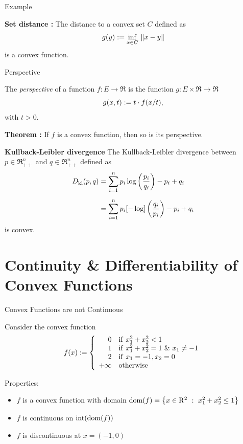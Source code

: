 \documentclass[9pt]{beamer}
\begin{document}
\begin{frame}{Example}

  \textbf{Set distance :} The distance to a convex set $C$ defined as
  \[
    g(y) := \inf_{x\in C} \, \left\|x-y\right\|
  \]
  is a convex function.

\end{frame}

\begin{frame}{Perspective}

  The \emph{perspective} of a function $f : E \to \Re$ is the function $g:E\times\Re \to\Re$
  \[
    g(x, t) := t \cdot f(x/t),
  \]
  with $t>0$.

  \vfill

  \textbf{Theorem : } If $f$ is a convex function, then so is its perspective.

  \vfill

  \textbf{Kullback-Leibler divergence} The Kullback-Leibler divergence between $p\in\Re^n_{++}$ and $q\in\Re^n_{++}$ defined as
  \begin{align*}
    D_{\rm{kl}}(p, q)   & = \sum_{i=1}^n p_i \log\left(\frac{p_i}{q_i}\right) - p_i + q_i \\[0.5em]
                      & = \sum_{i=1}^n p_i [-\log]\left(\frac{q_i}{p_i}\right) - p_i + q_i
  \end{align*}
  is convex.
  
\end{frame}


\section{Continuity \& Differentiability of Convex Functions}

\begin{frame}{Convex Functions are not Continuous}

  Consider the convex function
  \[
    f(x) :=\left\{
      \begin{array}{rl}
        0 & {\rm{if~}} x_1^2+x_2^2 < 1 \\
        1 & {\rm{if~}} x_1^2+x_2^2 = 1 ~\&~ x_1\neq -1 \\
        2 & {\rm{if~}} x_1=-1, x_2=0 \\
        +\infty & {\rm{otherwise}}
      \end{array}\right.
  \]

  \vfill
  
  Properties:
  \begin{itemize}
  \item $f$ is a convex function with domain $\operatorname{dom}(f) = \left\{ x\in\mathrm{R}^2\ : \ x^2_1+x^2_2 \leq 1 \right\}$
  \item $f$ is continuous on $\operatorname{int}(\operatorname{dom} (f))$
  \item $f$ is discontinuous at $x=(-1, 0)$
  \end{itemize}

\end{frame}
\end{document}

